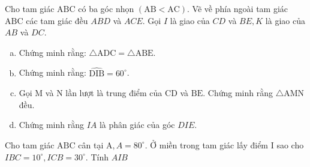 \begin{bt}
    Cho tam giác $\mathrm{ABC}$ có ba góc nhọn $(\mathrm{AB}<\mathrm{AC})$. Vẽ về phía ngoài tam giác $\mathrm{ABC}$ các tam giác đều $A B D$ và $A C E$. Gọi $I$ là giao của $C D$ và $B E, K$ là giao của $A B$ và $D C$.
    \begin{enumerate}[a.]
        \item Chứng minh rằng: $\triangle \mathrm{ADC}=\triangle \mathrm{ABE}$.
        \item Chứng minh rằng: $\widehat{\mathrm{DIB}}=60^{\circ}$.
        \item Gọi $\mathrm{M}$ và $\mathrm{N}$ lần lượt là trung điểm của $\mathrm{CD}$ và $\mathrm{BE}$. Chứng minh rằng $\triangle \mathrm{AMN}$ đều.
        \item Chứng minh rằng $IA$ là phân giác của góc $DIE$.
    \end{enumerate}
\loigiai{}
\end{bt}

\begin{bt}
    Cho tam giác $\mathrm{ABC}$ cân tại $\mathrm{A}, A=80^{\circ}$. Ở miền trong tam giác lấy điểm $\mathrm{I}$ sao cho $I B C=10^{\circ}, I C B=30^{\circ}$. Tính $A I B$
\loigiai{}
\end{bt}

